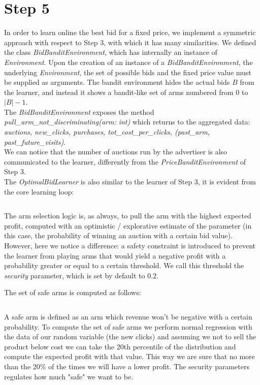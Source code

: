 \documentclass[11pt]{article} %
\begin{document}
\clearpage
\section{Step 5}
In order to learn online the best bid for a fixed price, we implement a symmetric approach with respect to Step 3, with which it has  many similarities. We defined the class \textit{BidBanditEnvironment}, which has internally an instance of \textit{Environment}. Upon the creation of an instance of a \textit{BidBanditEnvironment}, the underlying \textit{Environment}, the set of possible bids and the fixed price value must be supplied as arguments. The bandit environment hides the actual bids $B$ from the learner, and instead it shows a bandit-like set of arms numbered from $0$ to $|B|-1$.\\

The \textit{BidBanditEnvironment} exposes the method \textit{pull\_arm\_not\_discriminating(arm: int)} which returns to the aggregated data:\\
\textit{auctions, new\_clicks, purchases, tot\_cost\_per\_clicks, (past\_arm, past\_future\_visits)}.\\
We can notice that the number of auctions run by the advertiser is also communicated to the learner, differently from the \textit{PriceBanditEnvironment} of Step 3.\\

The \textit{OptimalBidLearner} is also similar to the learner of Step 3, it is evident from the core learning loop:
\inputminted{python}{code/step5_learning_loop.py}
The arm selection logic is, as always, to pull the arm with the highest expected profit, computed with an optimistic / explorative estimate of the parameter (in this case, the probability of winning an auction with a certain bid value). However, here we notice a difference: a safety constraint is introduced to prevent the learner from playing arms that would yield a negative profit with a probability greater or equal to a certain threshold. We call this threshold the \textit{security} parameter, which is set by default to $0.2$.\\

\begin{samepage}
The set of safe arms is computed as follows:
\inputminted{python}{code/step5_safety_constraint.py}
\end{samepage}

A safe arm is defined as an arm which revenue won't be negative with a certain probability. To compute the set of safe
arms we perform normal regression with the data of our random variable (the new clicks) and assuming we not to sell the
product below cost we can take the 20th percentile of the distribution and compute the expected profit with that value.
This way we are sure that no more than the 20\% of the times we will have a lower profit. The security parameters
regulates how much "safe" we want to be.
\end{document}
